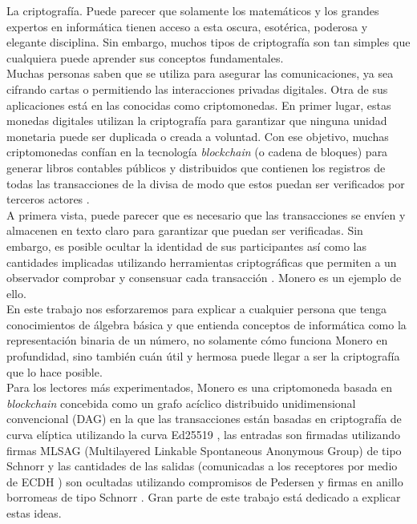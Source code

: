 

La criptografía. Puede parecer que solamente los matemáticos y los grandes expertos en informática tienen acceso a esta oscura, esotérica, poderosa y elegante disciplina. Sin embargo, muchos tipos de criptografía son tan simples que cualquiera puede aprender sus conceptos fundamentales.
\\ \newline
Muchas personas saben que se utiliza para asegurar las comunicaciones, ya sea cifrando cartas o permitiendo las interacciones privadas digitales. Otra de sus aplicaciones está en las conocidas como criptomonedas. En primer lugar, estas monedas digitales utilizan la criptografía para garantizar que ninguna unidad monetaria puede ser duplicada o creada a voluntad. Con ese objetivo, muchas criptomonedas confían en la tecnología \textit{blockchain} (o cadena de bloques) para generar libros contables públicos y distribuidos que contienen los registros de todas las transacciones de la divisa de modo que estos puedan ser verificados por terceros actores \cite{Nakamoto_bitcoin}.
\\ \newline
A primera vista, puede parecer que es necesario que las transacciones se envíen y almacenen en texto claro para garantizar que puedan ser verificadas. Sin embargo, es posible ocultar la identidad de sus participantes así como las cantidades implicadas utilizando herramientas criptográficas que permiten a un observador comprobar y consensuar cada transacción \cite{cryptoNoteWhitePaper}. Monero es un ejemplo de ello.
\\ \newline
En este trabajo nos esforzaremos para explicar a cualquier persona que tenga conocimientos de álgebra básica y que entienda conceptos de informática como la representación binaria de un número, no solamente cómo funciona Monero en profundidad, sino también cuán útil y hermosa puede llegar a ser la criptografía que lo hace posible.
\\ \newline
Para los lectores más experimentados, Monero es una criptomoneda basada en \textit{blockchain} concebida como un grafo acíclico distribuido unidimensional convencional (DAG) \cite{Nakamoto_bitcoin} en la que las transacciones están basadas en criptografía de curva elíptica utilizando la curva Ed25519 \cite{Bernstein2008}, las entradas son firmadas utilizando firmas MLSAG (Multilayered Linkable Spontaneous Anonymous Group) de tipo Schnorr \cite{MRL-0005} y las cantidades de las salidas (comunicadas a los receptores por medio de ECDH \cite{Diffie-Hellman}) son ocultadas utilizando compromisos de Pedersen \cite{maxwell-ct} y firmas en anillo borromeas de tipo Schnorr \cite{Signatures2015BorromeanRS}. Gran parte de este trabajo está dedicado a explicar estas ideas.